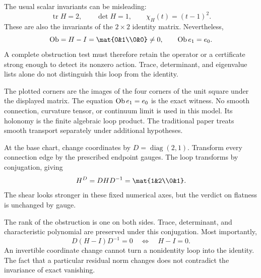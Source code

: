 
The usual scalar invariants can be misleading:
\[
\operatorname{tr}H=2,\qquad \det H=1,\qquad
\chi_H(t)=(t-1)^2.
\]
These are also the invariants of the $2\times2$ identity matrix. Nevertheless,
\[
\Ob=H-I=\mat{0&1\\0&0}\ne0,
\qquad \Ob e_1=e_0.
\]
A complete obstruction test must therefore retain the operator or a certificate strong enough to detect its nonzero action. Trace, determinant, and eigenvalue lists alone do not distinguish this loop from the identity.

The plotted corners are the images of the four corners of the unit square under the displayed matrix. The equation $\operatorname{Ob} e_1=e_0$ is the exact witness. No smooth connection, curvature tensor, or continuum limit is used in this model. Its holonomy is the finite algebraic loop product. The traditional paper treats smooth transport separately under additional hypotheses.


At the base chart, change coordinates by $D=\operatorname{diag}(2,1)$. Transform every connection edge by the prescribed endpoint gauges. The loop transforms by conjugation, giving
\[
H^D=DHD^{-1}=\mat{1&2\\0&1}.
\]
The shear looks stronger in these fixed numerical axes, but the verdict on flatness is unchanged by gauge.


The rank of the obstruction is one on both sides. Trace, determinant, and characteristic polynomial are preserved under this conjugation. Most importantly,
\[
D(H-I)D^{-1}=0\quad\Longleftrightarrow\quad H-I=0.
\]
An invertible coordinate change cannot turn a nonidentity loop into the identity. The fact that a particular residual norm changes does not contradict the invariance of exact vanishing.

